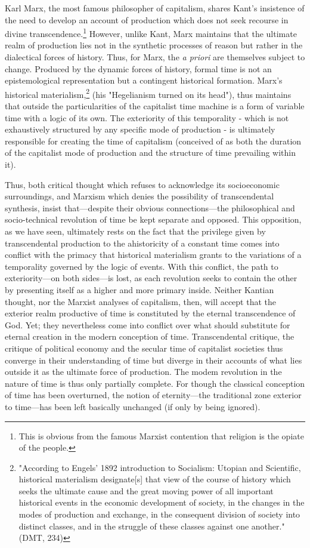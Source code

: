 Karl Marx, the most famous philosopher of capitalism, shares Kant's insistence of the need to develop an account of production which does not seek recourse in divine transcendence.\footnote{This is obvious from the famous Marxist contention that religion is the opiate of the people.} However, unlike Kant, Marx maintains that the ultimate realm of production lies not in the synthetic processes of reason but rather in the dialectical forces of history. Thus, for Marx, the \textit{a priori} are themselves subject to change. Produced by the dynamic forces of history, formal time is not an epistemological representation but a contingent historical formation. Marx's historical materialism,\footnote{"According to Engels' 1892 introduction to Socialism: Utopian and Scientific, historical materialism designate[s] that view of the course of history which seeks the ultimate cause and the great moving power of all important historical events in the economic development of society, in the changes in the modes of production and exchange, in the consequent division of society into distinct classes, and in the struggle of these classes against one another." (DMT, 234)} (his "Hegelianism turned on its head"), thus maintains that outside the particularities of the capitalist time machine is a form of variable time with a logic of its own. The exteriority of this temporality - which is not exhaustively structured by any specific mode of production - is ultimately responsible for creating the time of capitalism (conceived of as both the duration of the capitalist mode of production and the structure of time prevailing within it).

Thus, both critical thought which refuses to acknowledge its socioeconomic surroundings, and Marxism which denies the possibility of transcendental synthesis, insist that---despite their obvious connections---the philosophical and socio-technical revolution of time be kept separate and opposed. This opposition, as we have seen, ultimately rests on the fact that the privilege given by transcendental production to the ahistoricity of a constant time comes into conflict with the primacy that historical materialism grants to the variations of a temporality governed by the logic of events. With this conflict, the path to exteriority---on both sides---is lost, as each revolution seeks to contain the other by presenting itself as a higher and more primary inside. Neither Kantian thought, nor the Marxist analyses of capitalism, then, will accept that the exterior realm productive of time is constituted by the eternal transcendence of God. Yet; they nevertheless come into conflict over what should substitute for eternal creation in the modern conception of time. Transcendental critique, the critique of political economy and the secular time of capitalist societies thus converge in their understanding of time but diverge in their accounts of what lies outside it as the ultimate force of production. The modem revolution in the nature of time is thus only partially complete. For though the classical conception of time has been overturned, the notion of eternity---the traditional zone exterior to time---has been left basically unchanged (if only by being ignored). 


